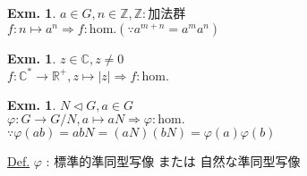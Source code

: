 \documentclass[uplatex,dvipdfmx,9pt]{beamer}
\newcommand{\nsubgroup}{\vartriangleleft} %
\newcounter{textExmCount}
\theoremstyle{definition} %
\theoremstyle{example}
\newtheorem{exmText}[textExmCount]{Exm.}
\begin{document}
      \begin{frame}

        \begin{exmText}
          $a \in G, n \in \mathbb{Z}, \mathbb{Z} : \text{加法群}$ \\
          $f\colon n \mapsto a^n \Rightarrow f: \text{hom.} (\because a^{m + n} = a^ma^n)$
        \end{exmText}

        \begin{exmText}
          $z \in \mathbb{C}, z \ne 0$ \\
          $f\colon \mathbb{C}^* \to \mathbb{R}^+,  z \mapsto |z| \Rightarrow f : \text{hom.}$
        \end{exmText}
      
        \begin{exmText}
          $N \nsubgroup G, a \in G$ \\
          $\varphi\colon G \to G/N, a \mapsto aN \Rightarrow \varphi : \text{hom.}$ \\
          $\because \varphi(ab) = abN = (aN)(bN) = \varphi(a)\varphi(b)$

          \underline{Def.}  $\varphi$ : \alert{標準的準同型写像} または \alert{自然な準同型写像}
          
        \end{exmText}

      \end{frame}
\end{document}
